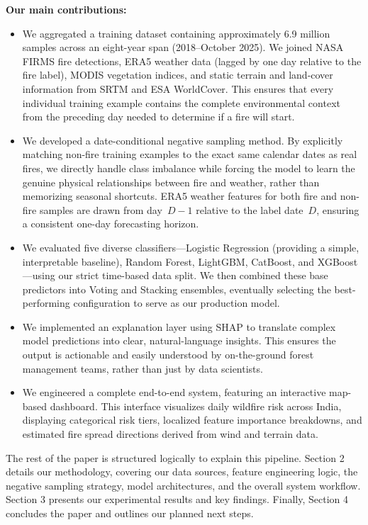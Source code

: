 \documentclass[11pt]{article}
\begin{document}
\textbf{Our main contributions:}

\begin{itemize}
    \item We aggregated a training dataset containing approximately 6.9 million samples across an eight-year span (2018--October 2025). We joined NASA FIRMS fire detections, ERA5 weather data (lagged by one day relative to the fire label), MODIS vegetation indices, and static terrain and land-cover information from SRTM and ESA WorldCover. This ensures that every individual training example contains the complete environmental context from the preceding day needed to determine if a fire will start.
    \item We developed a date-conditional negative sampling method. By explicitly matching non-fire training examples to the exact same calendar dates as real fires, we directly handle class imbalance while forcing the model to learn the genuine physical relationships between fire and weather, rather than memorizing seasonal shortcuts. ERA5 weather features for both fire and non-fire samples are drawn from day~$D{-}1$ relative to the label date~$D$, ensuring a consistent one-day forecasting horizon.
    \item We evaluated five diverse classifiers—Logistic Regression (providing a simple, interpretable baseline), Random Forest, LightGBM, CatBoost, and XGBoost—using our strict time-based data split. We then combined these base predictors into Voting and Stacking ensembles, eventually selecting the best-performing configuration to serve as our production model.
    \item We implemented an explanation layer using SHAP to translate complex model predictions into clear, natural-language insights. This ensures the output is actionable and easily understood by on-the-ground forest management teams, rather than just by data scientists.
    \item We engineered a complete end-to-end system, featuring an interactive map-based dashboard. This interface visualizes daily wildfire risk across India, displaying categorical risk tiers, localized feature importance breakdowns, and estimated fire spread directions derived from wind and terrain data.
\end{itemize}

\noindent The rest of the paper is structured logically to explain this pipeline. Section 2 details our methodology, covering our data sources, feature engineering logic, the negative sampling strategy, model architectures, and the overall system workflow. Section 3 presents our experimental results and key findings. Finally, Section 4 concludes the paper and outlines our planned next steps.
\end{document}
